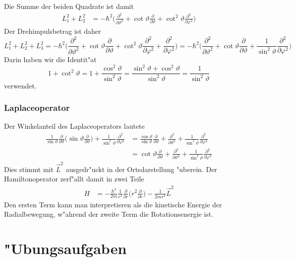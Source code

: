 Die Summe der beiden Quadrate ist damit
\begin{align*}
L_1^2+L_2^2
&=
-\hbar^2\biggl(
\frac{\partial^2}{\partial\vartheta^2}
+
\cot\vartheta\frac{\partial}{\partial\vartheta}
+
\cot^2\vartheta\frac{\partial^2}{\partial\varphi^2}
\biggr)
\end{align*}
Der Drehimpulsbetrag ist daher
\[
L_1^2+L_2^2+L_3^2
=
-\hbar^2\biggl(
\frac{\partial^2}{\partial\vartheta^2}
+
\cot\vartheta\frac{\partial}{\partial\vartheta}
+
\cot^2\vartheta\frac{\partial^2}{\partial\varphi^2}
+
\frac{\partial^2}{\partial\varphi^2}
\biggr)
=
-\hbar^2\biggl(
\frac{\partial^2}{\partial\vartheta^2}
+
\cot\vartheta\frac{\partial}{\partial\vartheta}
+
\frac1{\sin^2\vartheta}\frac{\partial^2}{\partial\varphi^2}
\biggr)
\]
Darin haben wir die Identit"at
\[
1+\cot^2\vartheta
=
1+\frac{\cos^2\vartheta}{\sin^2\vartheta}
=
\frac{\sin^2\vartheta+\cos^2\vartheta}{\sin^2\vartheta}
=
\frac{1}{\sin^2\vartheta}
\]
verwendet.

\subsubsection{Laplaceoperator}
Der Winkelanteil des Laplaceoperators lautete
\begin{align*}
\frac1{\sin\vartheta}\frac{\partial}{\partial\vartheta}\biggl(
\sin\vartheta\frac{\partial}{\partial\vartheta}
\biggr)
+\frac1{\sin^2\vartheta}\frac{\partial^2}{\partial\varphi^2}
&=
\frac{\cos\vartheta}{\sin\vartheta}\frac{\partial}{\partial\vartheta}
+
\frac{\partial^2}{\partial\vartheta^2}
+
\frac{1}{\sin^2\vartheta}\frac{\partial^2}{\partial\varphi^2}
\\
&=
\cot\vartheta\frac{\partial}{\partial\vartheta}
+
\frac{\partial^2}{\partial\vartheta^2}
+
\frac{1}{\sin^2\vartheta}\frac{\partial^2}{\partial\varphi^2}
\end{align*}
Dies stimmt mit $\vec L^2$ ausgedr"uckt in der Ortsdarstellung "uberein.
Der Hamiltonoperator zerf"allt damit in zwei Teile
\begin{align*}
H
&=-\frac{\hbar^2}{2m}
\frac1{r^2}\frac{\partial}{\partial r}\biggl(r^2\frac{\partial}{\partial r}\biggr)
-\frac{1}{2mr^2}\vec L^2
\end{align*}
Den ersten Term kann man interpretieren als die kinetische Energie
der Radialbewegung, w"ahrend der zweite Term die Rotationsenergie ist.

\section*{"Ubungsaufgaben}
\begin{uebungsaufgaben}
\item

\end{uebungsaufgaben}
